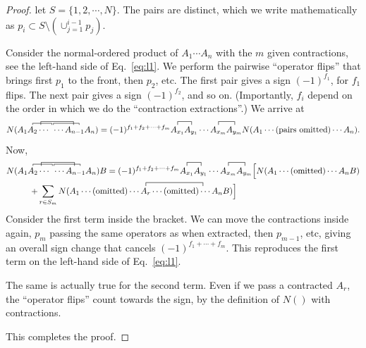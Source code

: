 \documentclass{report}
\theoremstyle{plain}
\theoremstyle{definition}
\begin{document}
\begin{proof}
  let $S = \{1,2,\cdots,N\}$. The pairs are distinct, which we write
  mathematically as $p_{i}
  \subset S \setminus (\cup_{j=1}^{i-1} p_j)$.
  
  Consider the normal-ordered product of $A_1\cdots A_n$ with the $m$
  given contractions, see the left-hand side of Eq.~\eqref{eq:l1}. We
  perform the pairwise ``operator flips'' that brings first $p_1$ to
  the front, then $p_2$, etc. The first pair gives a sign
  $(-1)^{f_1}$, for $f_1$ flips. The next pair gives a sign
  $(-1)^{f_2}$, and so on. (Importantly, $f_i$ depend on the order in
  which we do the ``contraction extractions''.) We arrive at
  \begin{equation}
    N({A_1 \contraction[.5ex]{}{A_2}{\cdots}{\;} A_2
      \contraction[1ex]{}{A}{\cdots\;\cdots}{A} \cdots
      \contraction[.5ex]{}{A}{\cdots}{A_{n-1}} \; \cdots A_{n-1}
      A_n}) = (-1)^{f_1+f_2+\cdots +f_m}
    \contraction{}{A_{x_1}}{}{A_{y_1}}A_{x_1} A_{y_1}\cdots \contraction{}{A_{x_m}}{}{A_{y_m}}A_{x_m} A_{y_m} N(A_1\cdots
    (\text{pairs omitted}) \cdots A_n).
  \end{equation}
  Now,
  \begin{equation}
    \begin{split}
      N(A_1  \contraction[.5ex]{}{A_2}{\cdots}{\;} A_2
        & \contraction[1ex]{}{A}{\cdots\;\cdots}{A} \cdots
        \contraction[.5ex]{}{A}{\cdots}{A_{n-1}} \; \cdots A_{n-1}
        A_n)B = (-1)^{f_1+f_2+\cdots +f_m}
      \contraction{}{A_{x_1}}{}{A_{y_1}}A_{x_1} A_{y_1}\cdots
      \contraction{}{A_{x_m}}{}{A_{y_m}}A_{x_m} A_{y_m} \Big[ N(A_1\cdots
        (\text{omitted}) \cdots A_n B)  \\ + & \sum_{r\in S_m} N(A_1\cdots
        (\text{omitted}) \cdots \contraction{}{A_r}{\cdots
          \text{(omitted)}}{B} A_r \cdots \text{(omitted)} \cdots A_n
        B)\Big]
    \end{split}
  \end{equation}
  Consider the first term inside the bracket. We can move the
  contractions inside again, $p_m$ passing the same operators as when
  extracted, then $p_{m-1}$, etc, giving an overall sign change that
  cancels $(-1)^{f_1+\cdots+f_m}$. This reproduces the first term on
  the left-hand side of Eq.~\eqref{eq:l1}.

  The same is actually true for the second term. Even if we pass a
  contracted $A_r$, the ``operator flips'' count towards the sign, by
  the definition of $N()$ with contractions.

  This completes the proof.
\end{proof}
\end{document}
